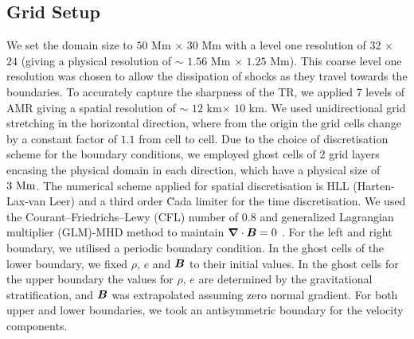 \subsection{Grid Setup}
\label{sec:Grid_Setup}
We set the domain size to $50$ Mm $\times$ $30$ Mm with a level one resolution of $32$ $\times$ $24$ (giving a physical resolution of $\sim$ $1.56$ Mm $\times$ $1.25$ Mm). This coarse level one resolution was chosen to allow the dissipation of shocks as they travel towards the boundaries. To accurately capture the sharpness of the TR, we applied 7 levels of AMR giving a spatial resolution of $\sim$ $12$ km$\times$ $10$ km. We used unidirectional grid stretching in the horizontal direction, where from the origin the grid cells change by a constant factor of $1.1$ from cell to cell. Due to the choice of discretisation scheme for the boundary conditions, we employed ghost cells of 2 grid layers encasing the physical domain in each direction, which have a physical size of $3~\rm{Mm}$. The numerical scheme applied for spatial discretisation is HLL (Harten-Lax-van Leer) \cite{hll_1983} and a third order \u{C}ada limiter \citep{CADA20094118} for the time discretisation. We used the Courant–Friedrichs–Lewy (CFL) number of $0.8$ and generalized Lagrangian multiplier (GLM)-MHD method to maintain $\boldsymbol{\nabla} \cdot \boldsymbol{B}=0$ \citep{DEDNER2002645}. For the left and right boundary, we utilised a periodic boundary condition. In the ghost cells of the lower boundary, we fixed $\rho$, $e$ and $\boldsymbol{B}$ to their initial values. In the ghost cells for the upper boundary the values for $\rho$, $e$ are determined by the gravitational stratification, and $\boldsymbol{B}$ was extrapolated assuming zero normal gradient. For both upper and lower boundaries, we took an antisymmetric boundary for the velocity components.
